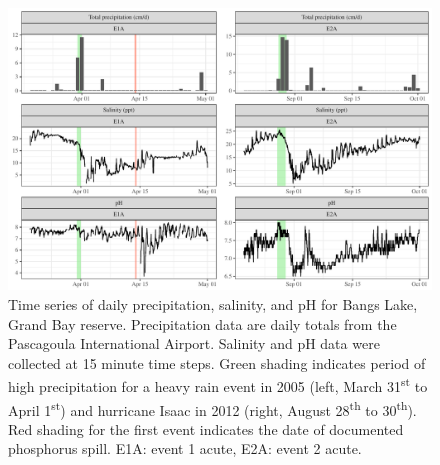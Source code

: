 \documentclass[letterpaper,12pt]{article}\usepackage[]{graphicx}\usepackage[]{color}
\makeatletter
\def\maxwidth{ %
  \ifdim\Gin@nat@width>\linewidth
    \linewidth
  \else
    \Gin@nat@width
  \fi
}
\makeatother
\begin{document}
\begin{figure}[!ht]

{\centering \includegraphics[width=\maxwidth]{figs/Fig3} 

}

\caption[Time series of daily precipitation, salinity, and pH for Bangs Lake, Grand Bay reserve]{Time series of daily precipitation, salinity, and pH for Bangs Lake, Grand Bay reserve.  Precipitation data are daily totals from the Pascagoula International Airport.  Salinity and pH data were collected at 15 minute time steps.  Green shading indicates period of high precipitation for a heavy rain event in 2005 (left, March 31\textsuperscript{st} to April 1\textsuperscript{st}) and hurricane Isaac in 2012 (right, August 28\textsuperscript{th} to 30\textsuperscript{th}).  Red shading for the first event indicates the date of documented phosphorus spill.  E1A: event 1 acute, E2A: event 2 acute.}\label{fig:Fig3}
\end{figure}


\clearpage
\end{document}
